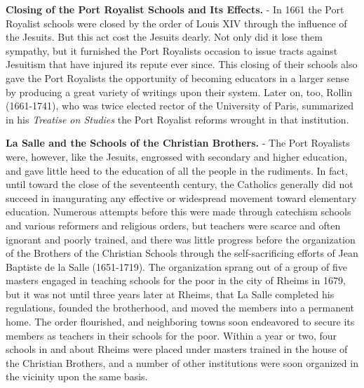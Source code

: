 \documentclass[
]{book}
\begin{document}
\textbf{Closing of the Port Royalist Schools and Its Effects.} - In 1661 the Port Royalist schools were closed by the order of Louis XIV through the influence of the Jesuits. But this act cost the Jesuits dearly. Not only did it lose them sympathy, but it furnished the Port Royalists occasion to issue tracts against Jesuitism that have injured its repute ever since. This closing of their schools also gave the Port Royalists the opportunity of becoming educators in a larger sense by producing a great variety of writings upon their system. Later on, too, Rollin (1661-1741), who was twice elected rector of the University of Paris, summarized in his \emph{Treatise on Studies} the Port Royalist reforms wrought in that institution.

\textbf{La Salle and the Schools of the Christian Brothers.} - The Port Royalists were, however, like the Jesuits, engrossed with secondary and higher education, and gave little heed to the education of all the people in the rudiments. In fact, until toward the close of the seventeenth century, the Catholics generally did not succeed in inaugurating any effective or widespread movement toward elementary education. Numerous attempts before this were made through catechism schools and various reformers and religious orders, but teachers were scarce and often ignorant and poorly trained, and there was little progress before the organization of the Brothers of the Christian Schools through the self-sacrificing efforts of Jean Baptiste de la Salle (1651-1719). The organization sprang out of a group of five masters engaged in teaching schools for the poor in the city of Rheims in 1679, but it was not until three years later at Rheims, that La Salle completed his regulations, founded the brotherhood, and moved the members into a permanent home. The order flourished, and neighboring towns soon endeavored to secure its members as teachers in their schools for the poor. Within a year or two, four schools in and about Rheims were placed under masters trained in the house of the Christian Brothers, and a number of other institutions were soon organized in the vicinity upon the same basis.
\end{document}
